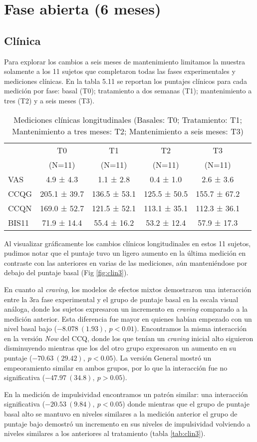 \section{Fase abierta (6 meses)}
\subsection{Clínica}
Para explorar los cambios a seis meses de mantenimiento limitamos la muestra solamente a los 11 sujetos que completaron todas las fases experimentales y mediciones clínicas. En la tabla 5.11 se reportan los puntajes clínicos para cada medición por fase: basal (T0); tratamiento a dos semanas (T1); mantenimiento a tres (T2) y a seis meses (T3).

\begin{table}[!hbp]
    \centering
    \small
    \caption{Mediciones clínicas longitudinales (Basales: T0; Tratamiento: T1; Mantenimiento a tres meses: T2; Mantenimiento a seis meses: T3)}
    \label{tab:cl3}
\begin{tabular}{lccccc}
\hline
 & T0 & T1 & T2 & T3 \\
 & (N=11) & (N=11) & (N=11) & (N=11) \\
\hline
VAS   &  4.9 ±  4.3 &  1.1 ±  2.8 &  0.4 ±  1.0 &  2.6 ±  3.6 \\
CCQG  & 205.1 ± 39.7 & 136.5 ± 53.1 & 125.5 ± 50.5 & 155.7 ± 67.2 \\
CCQN  & 169.0 ± 52.7 & 121.5 ± 52.1 & 113.1 ± 35.1 & 112.3 ± 36.1 \\
BIS11 & 71.9 ± 14.4 & 55.4 ± 16.2 & 53.2 ± 12.4 & 57.9 ± 17.3 \\
\hline
\end{tabular}
\end{table}

Al visualizar gráficamente los cambios clínicos longitudinales en estos 11 sujetos, pudimos notar que el puntaje tuvo un ligero aumento en la última medición en contraste con las anteriores en varias de las mediciones, aún manteniéndose por debajo del puntaje basal (Fig \ref{fig:clin3}). \par
En cuanto al \textit{craving}, los modelos de efectos mixtos demostraron una interacción entre la 3ra fase experimental y el grupo de puntaje basal en la escala visual análoga, donde los sujetos expresaron un incremento en \textit{craving} comparado a la medición anterior. Esta diferencia fue mayor en quienes habían empezado con un nivel basal bajo ($-8.078\ (1.93),\ p<0.01$). Encontramos la misma interacción en la versión \textit{Now} del CCQ, donde los que tenían un \textit{craving} inicial alto siguieron disminuyendo mientras que los del otro grupo expresaron un aumento en su puntaje ($-70.63\ (29.42),\ p<0.05$). La versión General mostró un empeoramiento similar en ambos grupos, por lo que la interacción fue no significativa ($-47.97\ (34.8),\ p>0.05$). \par
En la medición de impulsividad encontramos un patrón similar: una interacción significativa ($-20.53\ (9.84),\ p<0.05$) donde mientras que el grupo de puntaje basal alto se mantuvo en niveles similares a la medición anterior el grupo de puntaje bajo demostró un incremento en sus niveles de impulsividad volviendo a niveles similares a los anteriores al tratamiento (tabla \ref{tab:clin3}).

